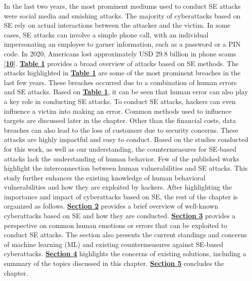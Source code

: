  In the last two years, the most prominent mediums used to conduct SE attacks were social media and smishing attacks. The majority of cyberattacks based on SE rely on actual interactions between the attacker and the victim. In some cases, SE attacks can involve a simple phone call, with an individual impersonating an employee to garner information, such as a password or a PIN code. In 2020, Americans lost approximately USD 29.8 billion in phone scams [\href{https://www.mdpi.com/2076-3417/12/12/6042\#B10-applsci-12-06042}{\textbf{10}}]. \href{https://www.mdpi.com/2076-3417/12/12/6042\#table_body_display_applsci-12-06042-t001}{\textbf{Table 1}} provides a broad overview of attacks based on SE methods. The attacks highlighted in \href{https://www.mdpi.com/2076-3417/12/12/6042\#table_body_display_applsci-12-06042-t001}{\textbf{Table 1}} are some of the most prominent breaches in the last few years. These breaches occurred due to a combination of human errors and SE attacks. Based on \href{https://www.mdpi.com/2076-3417/12/12/6042\#table_body_display_applsci-12-06042-t001}{\textbf{Table 1}}, it can be seen that human error can also play a key role in conducting SE attacks. To conduct SE attacks, hackers can even influence a victim into making an error. Common methods used to influence targets are discussed later in the chapter. Other than the financial costs, data breaches can also lead to the loss of customers due to security concerns. These attacks are highly impactful and easy to conduct. Based on the studies conducted for this work, as well as our understanding, the countermeasures for SE-based attacks lack the understanding of human behavior. Few of the published works highlight the interconnection between human vulnerabilities and SE attacks. This study further enhances the existing knowledge of human behavioral vulnerabilities and how they are exploited by hackers. After highlighting the importance and impact of cyberattacks based on SE, the rest of the chapter is organized as follows. \href{https://www.mdpi.com/2076-3417/12/12/6042\#sec2-applsci-12-06042}{\textbf{Section 2}} provides a brief overview of well-known cyberattacks based on SE and how they are conducted. \href{https://www.mdpi.com/2076-3417/12/12/6042\#sec3-applsci-12-06042}{\textbf{Section 3}} provides a perspective on common human emotions or errors that can be exploited to conduct SE attacks. The section also presents the current standings and concerns of machine learning (ML) and existing countermeasures against SE-based cyberattacks. \href{https://www.mdpi.com/2076-3417/12/12/6042\#sec4-applsci-12-06042}{\textbf{Section 4}} highlights the concerns of existing solutions, including a summary of the topics discussed in this chapter. \href{https://www.mdpi.com/2076-3417/12/12/6042\#sec5-applsci-12-06042}{\textbf{Section 5}} concludes the chapter.



